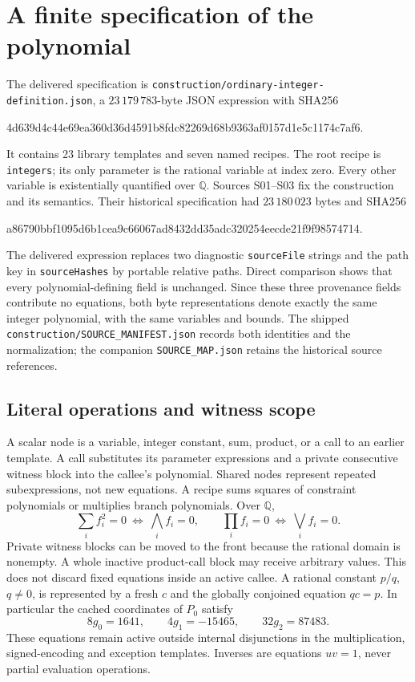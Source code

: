 \documentclass[11pt]{article}
\theoremstyle{definition}
\theoremstyle{remark}
\newcommand{\Q}{\mathbb Q}
\begin{document}
\section{A finite specification of the polynomial}\label{sec:syntax}
The delivered specification is
\nolinkurl{construction/ordinary-integer-definition.json}, a
$23\,179\,783$-byte JSON expression with SHA256
\begin{center}\small\ttfamily
4d639d4c44e69ea360d36d4591b8fdc82269d68b9363af0157d1e5c1174c7af6.
\end{center}
It contains 23 library templates and seven named recipes. The root recipe
is \texttt{integers}; its only parameter is the rational variable at index
zero. Every other variable is existentially quantified over $\Q$.
Sources S01--S03 fix the construction and its semantics. Their historical
specification had $23\,180\,023$ bytes and SHA256
\begin{center}\small\ttfamily
a86790bbf1095d6b1cea9c66067ad8432dd35adc320254eecde21f9f98574714.
\end{center}
The delivered expression replaces two diagnostic \texttt{sourceFile}
strings and the path key in \texttt{sourceHashes} by portable relative
paths. Direct comparison shows that every polynomial-defining field is
unchanged. Since these three provenance fields contribute no equations,
both byte representations denote exactly the same integer polynomial,
with the same variables and bounds. The shipped
\nolinkurl{construction/SOURCE_MANIFEST.json} records both identities and
the normalization; the companion \texttt{SOURCE\_MAP.json} retains the
historical source references.

\subsection{Literal operations and witness scope}
A scalar node is a variable, integer constant, sum, product, or a call to
an earlier template. A call substitutes its parameter expressions and a
private consecutive witness block into the callee's polynomial. Shared
nodes represent repeated subexpressions, not new equations. A recipe
sums squares of constraint polynomials or multiplies branch polynomials.
Over $\Q$,
\[
 \sum_i f_i^2=0\ \Longleftrightarrow\ \bigwedge_i f_i=0,
 \qquad\prod_i f_i=0\ \Longleftrightarrow\ \bigvee_i f_i=0.
\]
Private witness blocks can be moved to the front because the rational
domain is nonempty. A whole inactive product-call block may receive
arbitrary values. This does not discard fixed equations inside an active
callee. A rational constant $p/q$, $q\ne0$, is represented by a fresh
$c$ and the globally conjoined equation $qc=p$. In particular the cached
coordinates of $P_0$ satisfy
\[
 8g_0=1641,\qquad4g_1=-15465,\qquad32g_2=87483.
\]
These equations remain active outside internal disjunctions in the
multiplication, signed-encoding and exception templates. Inverses are
equations $uv=1$, never partial evaluation operations.
\end{document}
